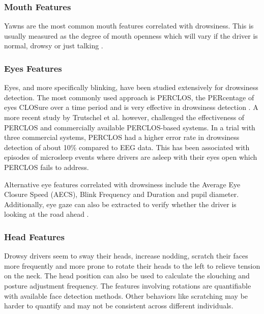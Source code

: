 \documentclass[a4paper]{article}
\begin{document}
\hypertarget{mouth-features}{%
\subsubsection{Mouth Features}\label{mouth-features}}

Yawns are the most common mouth features correlated with drowsiness.
This is usually measured as the degree of mouth openness which will vary
if the driver is normal, drowsy or just talking
\cite{qiong_wang_driver_2006}.

\hypertarget{eyes-features}{%
\subsubsection{Eyes Features}\label{eyes-features}}

Eyes, and more specifically blinking, have been studied extensively for
drowsiness detection. The most commonly used approach is PERCLOS, the
PERcentage of eyes CLOSure over a time period and is very effective in
drowsiness detection \cite{sahayadhas_detecting_2012}. A more recent
study by Trutschel et al. \cite{trutschel_perclos:_2011} however,
challenged the effectiveness of PERCLOS and commercially available
PERCLOS-based systems. In a trial with three commercial systems, PERCLOS
had a higher error rate in drowsiness detection of about 10\% compared
to EEG data. This has been associated with episodes of microsleep events
where drivers are asleep with their eyes open which PERCLOS fails to
address.

Alternative eye features correlated with drowsiness include the Average
Eye Closure Speed (AECS), Blink Frequency and Duration and pupil
diameter. Additionally, eye gaze can also be extracted to verify whether
the driver is looking at the road ahead \cite{qiong_wang_driver_2006}.

\hypertarget{head-features}{%
\subsubsection{Head Features}\label{head-features}}

Drowsy drivers seem to sway their heads, increase nodding, scratch their
faces more frequently and more prone to rotate their heads to the left
to relieve tension on the neck. The head position can also be used to
calculate the slouching and posture adjustment frequency. The features
involving rotations are quantifiable with available face detection
methods. Other behaviors like scratching may be harder to quantify and
may not be consistent across different individuals.
\cite{eskandarian_evaluation_2007}
\end{document}
